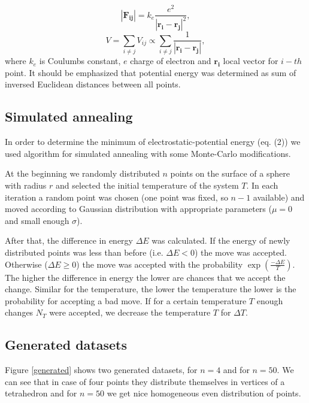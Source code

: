 \documentclass[a4paper, 12pt]{article}
\newcommand{\vect}[1]{\boldsymbol{#1}}
\begin{document}
\begin{equation}
	|\vect{F_{ij}}| = k_e \frac{e^2}{|\vect{r_i}-\vect{r_j}|^2},
\end{equation}
\begin{equation}
	V = \sum_{i\neq j}V_{ij} \propto \sum_{i\neq j}\frac{1}{|\vect{r_i} - \vect{r_j}|},
\end{equation}
where $k_e$ is Coulumbs constant, $e$ charge of electron and $\vect{r_i}$ local vector for $i-th$ point. It should be emphasized that potential energy was determined as sum of inversed Euclidean distances between all points. 

\subsection{Simulated annealing}
In order to determine the minimum of electrostatic-potential energy (eq. (2)) we used algorithm for simulated annealing with some Monte-Carlo modifications. 

At the beginning we randomly distributed $n$ points on the surface of a sphere with radius $r$ and selected the initial temperature of the system $T$. In each iteration a random point was chosen (one point was fixed, so $n-1$ available) and moved according to Gaussian distribution with appropriate parameters ($\mu = 0$ and small enough $\sigma$). 

After that, the difference in energy $\Delta E$ was calculated. If the energy of newly distributed points was less than before (i.e. $\Delta E < 0$) the move was accepted. Otherwise ($\Delta E \geq 0$) the move was accepted with the probability $\exp(\frac{-\Delta E}{T})$. The higher the difference in energy the lower are chances that we accept the change. Similar for the temperature, the lower the temperature the lower is the probability for accepting a bad move. If for a certain temperature $T$ enough changes $N_T$ were accepted, we decrease the temperature $T$ for $\Delta T$.

\subsection{Generated datasets}

Figure \ref{generated} shows two generated datasets, for $n = 4$ and for $n = 50$. We can see that in case of four points they distribute themselves in vertices of a tetrahedron and for $n = 50$ we get nice homogeneous even distribution of points.
\end{document}
